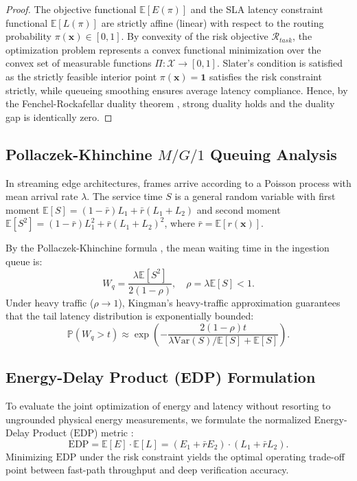 \documentclass[conference]{IEEEtran}
\begin{document}
\begin{proof}
The objective functional $\mathbb{E}[E(\pi)]$ and the SLA latency constraint functional $\mathbb{E}[L(\pi)]$ are strictly affine (linear) with respect to the routing probability $\pi(\mathbf{x}) \in [0, 1]$. By convexity of the risk objective $\mathcal{R}_{task}$, the optimization problem represents a convex functional minimization over the convex set of measurable functions $\Pi: \mathcal{X} \to [0, 1]$. Slater's condition is satisfied as the strictly feasible interior point $\pi(\mathbf{x}) = \mathbf{1}$ satisfies the risk constraint strictly, while queueing smoothing ensures average latency compliance. Hence, by the Fenchel-Rockafellar duality theorem \cite{rockafellar1970convex}, strong duality holds and the duality gap is identically zero.
\end{proof}

\subsection{Pollaczek-Khinchine $M/G/1$ Queuing Analysis}
In streaming edge architectures, frames arrive according to a Poisson process with mean arrival rate $\lambda$. The service time $S$ is a general random variable with first moment $\mathbb{E}[S] = (1 - \bar{r}) L_1 + \bar{r} (L_1 + L_2)$ and second moment $\mathbb{E}[S^2] = (1 - \bar{r}) L_1^2 + \bar{r} (L_1 + L_2)^2$, where $\bar{r} = \mathbb{E}[r(\mathbf{x})]$.

By the Pollaczek-Khinchine formula \cite{kleinrock1975queueing}, the mean waiting time in the ingestion queue is:
\begin{equation}
W_q = \frac{\lambda \mathbb{E}[S^2]}{2(1 - \rho)}, \quad \rho = \lambda \mathbb{E}[S] < 1.
\end{equation}
Under heavy traffic ($\rho \to 1$), Kingman's heavy-traffic approximation \cite{kingman1961single} guarantees that the tail latency distribution is exponentially bounded:
\begin{equation}
\mathbb{P}(W_q > t) \approx \exp\left( -\frac{2(1 - \rho) t}{\lambda \mathrm{Var}(S) / \mathbb{E}[S] + \mathbb{E}[S]} \right).
\end{equation}

\subsection{Energy-Delay Product (EDP) Formulation}
To evaluate the joint optimization of energy and latency without resorting to ungrounded physical energy measurements, we formulate the normalized Energy-Delay Product ($\mathrm{EDP}$) metric \cite{gonzalez1997energy}:
\begin{equation}
\mathrm{EDP} = \mathbb{E}[E] \cdot \mathbb{E}[L] = \left( E_1 + \bar{r} E_2 \right) \cdot \left( L_1 + \bar{r} L_2 \right).
\end{equation}
Minimizing $\mathrm{EDP}$ under the risk constraint yields the optimal operating trade-off point between fast-path throughput and deep verification accuracy.
\end{document}
